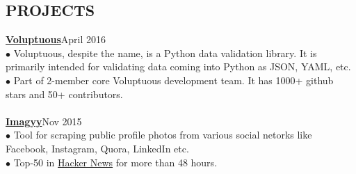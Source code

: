 \documentclass[margin,line]{resume}
\begin{document}
\begin{resume}
\section{\mysidestyle \bf PROJECTS} 

 {\bf\href{https://github.com/alecthomas/voluptuous}{Voluptuous}}\hfill April 2016 \\
$\bullet$ Voluptuous, despite the name, is a Python data validation library. It is primarily intended for validating data coming into Python as JSON, YAML, etc. \\
$\bullet$ Part of 2-member core Voluptuous development team. It has 1000+ github stars and 50+ contributors.
\\\\{\bf\href{https://github.com/tusharmakkar08/Imagyy}{Imagyy}}\hfill Nov 2015 \\
$\bullet$ Tool for scraping public profile photos from various social netorks like Facebook, Instagram, Quora, LinkedIn etc.\\ 
$\bullet$ Top-50 in \href{https://news.ycombinator.com/show}{Hacker News} for more than 48 hours.
 

\end{resume}
\end{document}
